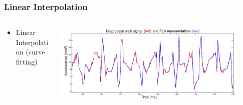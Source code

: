 \documentclass{beamer}
\begin{document}
\begin{frame}
  \frametitle{Linear Interpolation}
  \begin{columns}
  \begin{column}{0.4\textwidth}
  \begin{itemize}
  	\item Linear Interpolation (curve fitting)

  \end{itemize}
  \end{column}  
  
\begin{column}{0.6\textwidth}


\includegraphics[width=0.91\textwidth]{Illustrations/linear.png}

\end{column}   
  
  \end{columns}
\end{frame}
\end{document}
